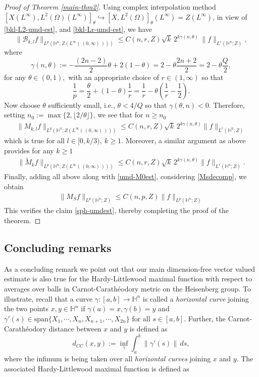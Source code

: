 \documentclass[11pt]{amsart}
\newcommand{\Ha}{\mathbb{H}^n}
\theoremstyle{definition}
\numberwithin{equation}{section}
\begin{document}
\begin{proof}[Proof of Theorem \ref{main-thm2}]
Using complex interpolation method $[X(L^\infty), L^2(\Omega)(L^\infty)]_{\theta}\hookrightarrow [X, L^2(\Omega)]_{\theta}(L^\infty)= Z(L^\infty)$, in view of \eqref{bkl-L2-umd-est}, and \eqref{bkl-Lr-umd-est}, we have 
\begin{equation}
    \label{bkl-lp-umdZ-est}
     \|\mathcal{B}_{k,l}f\|_{L^p(\Ha; Z(L^\infty(\,(0, \infty)\,)))}\leq C(n, r, Z)\sqrt{k}\,2^{k \gamma(n, \theta)}\, \|f\|_{L^r(\Ha; Z)},
\end{equation}
where $$\gamma(n, \theta):=-\frac{(2n-2)}{2}\theta +2(1-\theta)=2-\theta \frac{2n+2}{2}=2-\theta\frac{Q}{2} ,$$ for  any $\theta\in (0, 1),$ with an appropriate choice of $r\in (1,\infty)$ so that  
$$\frac1p = \frac\theta 2 + (1 - \theta) \frac1{r}= \frac1r-\theta\left(\frac1r-\frac12\right).$$
Now choose $\theta$ sufficiently small, i.e., $\theta<4/Q$ so that $\gamma(\theta, n)<0. $ Therefore, setting  $n_0:= \max \{ 2, \lfloor 2/\theta\rfloor\}$, we see that for $n\geq n_0$
\begin{align*}
     \|M_{k,l}f\|_{L^p(\Ha; Z(L^\infty(\,(0, \infty)\,)))}\leq C(n, r, Z)\sqrt{k}\,2^{k \gamma(n, \theta)} \|f\|_{L^r(\Ha; Z)}
\end{align*}
which is true for all $l\in [0,k/3),~k\geq 1.$
Moreover, a similar argument as above provides for any $k\geq 1$
\begin{align*}
     \|\widetilde{M}_{k}f\|_{L^p(\Ha; Z(L^\infty(\,(0, \infty)\,)))}\leq C(n, r, Z)\sqrt{k}\,2^{k \gamma(n, \theta)} \|f\|_{L^r(\Ha; Z)}.
\end{align*}
Finally, adding all above along with \eqref{umd-M0est}, considering \eqref{Msdecomp}, we obtain 
\begin{align*}
     \|M_Sf\|_{L^p(\Ha; Z)}\leq C(n,p,Z) \|f\|_{L^p(\Ha; Z)}
\end{align*}
This verifies the claim \eqref{sph-umdest}, thereby completing the proof of the theorem.
    \end{proof}

\subsection*{Concluding remarks} As a concluding remark we point out that our main dimension-free vector valued estimate is also true for the Hardy-Littlewood maximal function with respect to averages over balls in Carnot-Carath\'eodory metric on the Heisenberg group. To illustrate, recall that a curve $\gamma:[a, b]\to \Ha$ is called a \textit{horizontal curve} joining the two points $x, y\in \Ha$ if $\gamma(a)=x, \gamma(b)=y$ and $\gamma'(s)\in \text{span}\{X_{1}, \cdots, X_{n}, X_{n+1},\cdots, X_{2n}\}$ for all $s\in [a, b].$ Further, the Carnot-Carath\'eodory distance between $x$ and $y$ is defined as 
\[d_{CC}(x, y):=\inf_{\gamma}\int_{a}^{b}\|\gamma'(s)\|\, ds,\]
where the infimum is being taken over all \textit{horizontal curves} joining $x$ and $y.$ The associated Hardy-Littlewood maximal function is defined as 
\end{document}
